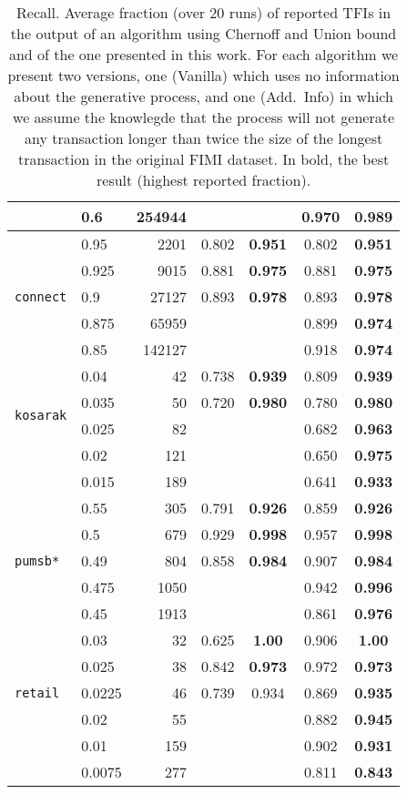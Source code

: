 \begin{table}[htbp]
\begin{tabular}{llrcccc}
 & 0.6 & 254944 & &  & 0.970& \bf 0.989\\
\midrule
\multirow{5}{*}{\texttt{connect}} & 0.95 & 2201 & 0.802& \bf 0.951&
0.802& \bf 0.951\\
 & 0.925 & 9015 & 0.881& \bf 0.975& 0.881& \bf 0.975 \\
 & 0.9 & 27127 & 0.893& \bf 0.978& 0.893& \bf 0.978\\
 & 0.875 & 65959 & &  & 0.899& \bf 0.974\\
 & 0.85 & 142127 & &  & 0.918& \bf 0.974\\
\midrule
\multirow{4}{*}{\texttt{kosarak}} & 0.04 & 42 & 0.738& \bf 0.939&
0.809& \bf 0.939\\
 & 0.035 & 50 & 0.720& \bf 0.980& 0.780& \bf 0.980\\
 & 0.025 & 82 & &  & 0.682& \bf0.963\\
 & 0.02 & 121 & &  & 0.650& \bf 0.975\\
 & 0.015 & 189 & &  & 0.641& \bf 0.933\\
\midrule
\multirow{5}{*}{\texttt{pumsb*}} & 0.55 & 305 & 0.791& \bf 0.926&
0.859& \bf 0.926\\
 & 0.5 & 679 & 0.929& \bf 0.998& 0.957& \bf 0.998\\
 & 0.49 & 804 & 0.858& \bf 0.984& 0.907& \bf 0.984\\
 & 0.475 & 1050 & &  & 0.942& \bf 0.996\\
 & 0.45 & 1913 & &  & 0.861& \bf 0.976\\
\midrule
\multirow{5}{*}{\texttt{retail}} & 0.03 & 32 & 0.625& \bf 1.00&
0.906& \bf 1.00\\
 & 0.025 & 38 & 0.842& \bf 0.973& 0.972& \bf 0.973\\
 & 0.0225 & 46 & 0.739& 0.934& 0.869& \bf 0.935\\
 & 0.02 & 55 & &  & 0.882& \bf 0.945\\
 & 0.01 & 159 & &  & 0.902& \bf 0.931\\
 & 0.0075 & 277 & &  & 0.811& \bf 0.843\\
 \bottomrule
 \end{tabular}
  \caption{Recall. Average fraction (over 20 runs) of reported TFIs
  in the output of an algorithm using Chernoff and Union bound and of the one
  presented in this work. For each algorithm we present two versions, one
  (Vanilla) which uses no information about the generative process, and one
  (Add.~Info) in which we assume the knowlegde that the process will not
  generate any transaction longer than twice the size of the longest transaction
  in the original FIMI dataset. In bold, the best result (highest reported
  fraction).}
\label{table:power}
\end{table}

